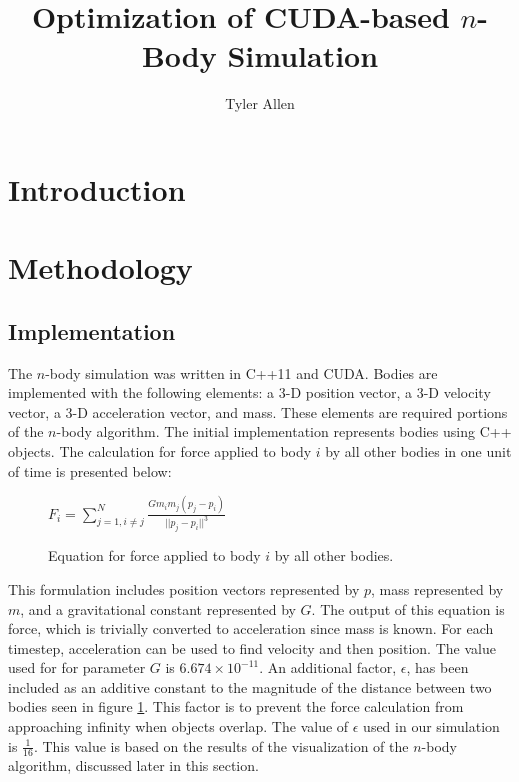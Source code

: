 \documentclass[10pt]{IEEEtran}
\newcommand{\?}{\stackrel{?}{=}}
\begin{document}
\title{Optimization of CUDA-based $n$-Body Simulation}
\date{}
\author{Tyler Allen}
\maketitle

\begin{abstract}
\end{abstract}

\section{Introduction}

\section{Methodology}
\subsection{Implementation}
The $n$-body simulation was written in C++11 and CUDA. Bodies are implemented
with the following elements: a $3$-D position vector, a $3$-D velocity vector,
a $3$-D acceleration vector, and mass. These elements are required portions of
the $n$-body algorithm\cite{meyer}. The initial implementation represents
bodies using C++ objects. The calculation for force applied to body $i$
by all other bodies in one unit of time is presented below\cite{meyer}:
\begin{figure}[H]
\begin{center}
$F_{i} = \sum_{j=1, i\neq j}^{N}\frac{Gm_im_j(p_j - p_i)}{||p_j - p_i||^3}$
\end{center}
\caption{Equation for force applied to body $i$ by all other bodies.}
\label{nbody}
\end{figure}
This formulation includes position vectors represented by $p$, mass represented
by $m$, and a gravitational constant represented by $G$. The output of this
equation is force, which is trivially converted to acceleration since mass 
is known. For each timestep, acceleration can be used to find velocity and 
then position. The value used for for parameter $G$ is $6.674 \times 10^{-11}$\cite{meyer}.
An additional factor, $\epsilon$, has been included as an additive constant
to the magnitude of the distance between two bodies seen in figure \ref{nbody}\cite{nvidia}. 
This factor is to prevent the force calculation from approaching infinity when
objects overlap. The value of $\epsilon$ used in our simulation is 
$\frac{1}{16}$. This value is based on the results of the visualization of the 
$n$-body algorithm, discussed later in this section.
\end{document}
